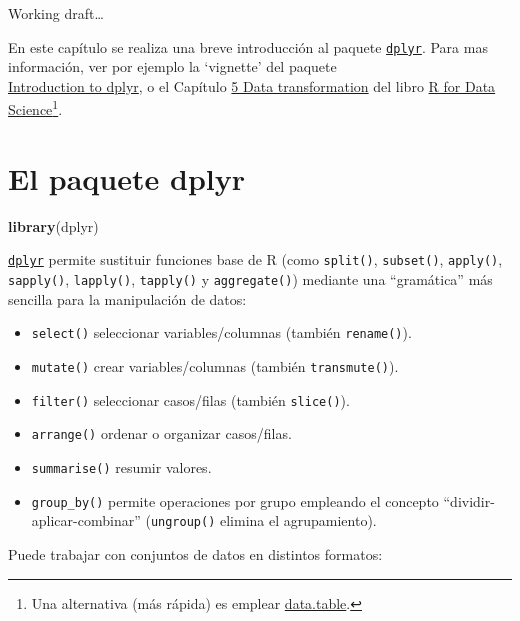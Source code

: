 \documentclass[]{book}
\newenvironment{Shaded}{\begin{snugshade}}{\end{snugshade}}
\newcommand{\KeywordTok}[1]{\textcolor[rgb]{0.13,0.29,0.53}{\textbf{#1}}}
\newcommand{\NormalTok}[1]{#1}
\let\rmarkdownfootnote\footnote%
\def\footnote{\protect\rmarkdownfootnote}
\begin{document}
Working draft\ldots{}

En este capítulo se realiza una breve introducción al paquete
\href{https://dplyr.tidyverse.org/index.html}{\texttt{dplyr}}. Para mas
información, ver por ejemplo la `vignette' del paquete\\
\href{https://cran.rstudio.com/web/packages/dplyr/vignettes/dplyr.html}{Introduction
to dplyr}, o el Capítulo \href{http://r4ds.had.co.nz/transform.html}{5
Data transformation} del libro \href{http://r4ds.had.co.nz}{R for Data
Science}\footnote{Una alternativa (más rápida) es emplear
  \href{https://rdatatable.gitlab.io/data.table}{data.table}.}.

\section{\texorpdfstring{El paquete
\textbf{dplyr}}{El paquete dplyr}}\label{el-paquete-dplyr}

\begin{Shaded}
\begin{Highlighting}[]
\KeywordTok{library}\NormalTok{(dplyr)}
\end{Highlighting}
\end{Shaded}

\href{https://dplyr.tidyverse.org/index.html}{\texttt{dplyr}} permite
sustituir funciones base de R (como \texttt{split()}, \texttt{subset()},
\texttt{apply()}, \texttt{sapply()}, \texttt{lapply()},
\texttt{tapply()} y \texttt{aggregate()}) mediante una ``gramática'' más
sencilla para la manipulación de datos:

\begin{itemize}
\item
  \texttt{select()} seleccionar variables/columnas (también
  \texttt{rename()}).
\item
  \texttt{mutate()} crear variables/columnas (también
  \texttt{transmute()}).
\item
  \texttt{filter()} seleccionar casos/filas (también \texttt{slice()}).
\item
  \texttt{arrange()} ordenar o organizar casos/filas.
\item
  \texttt{summarise()} resumir valores.
\item
  \texttt{group\_by()} permite operaciones por grupo empleando el
  concepto ``dividir-aplicar-combinar'' (\texttt{ungroup()} elimina el
  agrupamiento).
\end{itemize}

Puede trabajar con conjuntos de datos en distintos formatos:
\end{document}
